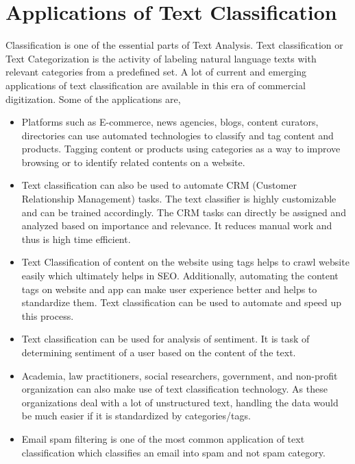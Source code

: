 \section{Applications of Text Classification}
Classification is one of the essential parts of Text Analysis. Text classification or Text Categorization is the activity of labeling natural language texts with relevant categories from a predefined set. A lot of current and emerging applications of text classification are available in this era of commercial digitization. Some of the applications are,
\begin{itemize}
    \item Platforms such as E-commerce, news agencies, blogs, content curators, directories can use automated technologies to classify and tag content and products. Tagging content or products using categories as a way to improve browsing or to identify related contents on a website.
    
    \item Text classification can also be used to automate CRM (Customer Relationship Management) tasks. The text classifier is highly customizable and can be trained accordingly. The CRM tasks can directly be assigned and analyzed based on importance and relevance. It reduces manual work and thus is high time efficient.
    
    \item Text Classification of content on the website using tags helps to crawl website easily which ultimately helps in SEO. Additionally, automating the content tags on website and app can make user experience better and helps to standardize them. Text classification can be used to automate and speed up this process.
    
    \item Text classification can be used for analysis of sentiment. It is task of determining sentiment of a user based on the content of the text.
    
    \item Academia, law practitioners, social researchers, government, and non-profit organization can also make use of text classification technology. As these organizations deal with a lot of unstructured text, handling the data would be much easier if it is standardized by categories/tags.
    
    \item Email spam filtering is one of the most common application of text classification which classifies an email into spam and not spam category.
\end{itemize}

